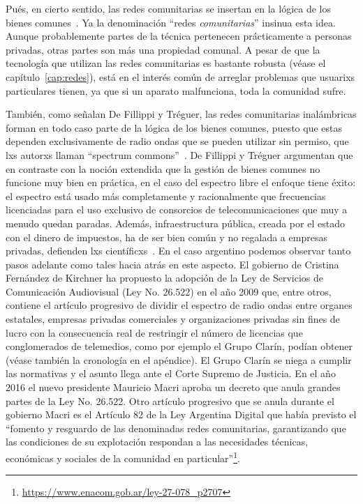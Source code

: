 Pués, en cierto sentido, las redes comunitarias se insertan en la lógica de los bienes comunes~\autocite{FiTre2015}.
Ya la denominación ``redes \textit{comunitarias}'' insinua esta idea.
Aunque probablemente partes de la técnica pertenecen prácticamente a personas privadas, otras partes son más una propiedad comunal.
A pesar de que la tecnología que utilizan las redes comunitarias es bastante robusta (véase el capítulo~\vref{cap:redes}), está en el interés común de arreglar problemas que usuarixs particulares tienen, ya que si un aparato malfunciona, toda la comunidad sufre.

También, como señalan De Fillippi y Tréguer, las redes comunitarias inalámbricas forman en todo caso parte de la lógica de los bienes comunes, puesto que estas dependen exclusivamente de radio ondas que se pueden utilizar sin permiso, que lxs autorxs llaman ``spectrum commons''~\autocite{FiTre2015}.
De Fillippi y Tréguer argumentan que en contraste con la noción extendida que la gestión de bienes comunes no funcione muy bien en práctica, en el caso del espectro libre el enfoque tiene éxito:
el espectro está usado más completamente y racionalmente que frecuencias licenciadas para el uso exclusivo de consorcios de telecomunicaciones que muy a menudo quedan paradas.
Además, infraestructura pública, creada por el estado con el dinero de impuestos, ha de ser bien común y no regalada a empresas privadas, defienden lxs científicxs~\autocite{FiTre2015}.
En el caso argentino podemos observar tanto pasos adelante como tales hacia atrás en este aspecto.
El gobierno de Cristina Fernández de Kirchner ha propuesto la adopción de la Ley de Servicios de Comunicación Audiovisual (Ley No. 26.522) en el año 2009 que, entre otros, contiene el artículo progresivo de dividir el espectro de radio ondas entre organes estatales, empresas privadas comerciales y organizaciones privadas sin fines de lucro con la consecuencia real de restringir el número de licencias que conglomerados de telemedios, como por ejemplo el Grupo Clarín, podían obtener (véase también la cronología en el apéndice).
El Grupo Clarín se niega a cumplir las normativas y el asunto llega ante el Corte Supremo de Justicia.
En el año 2016 el nuevo presidente Mauricio Macri aproba un decreto que anula grandes partes de la Ley No. 26.522.
Otro artículo progresivo que se anula durante el gobierno Macri es el Artículo 82 de la Ley Argentina Digital que había previsto el ``fomento y resguardo de las denominadas redes comunitarias, garantizando que las condiciones de su explotación respondan a las necesidades técnicas, económicas y sociales de la comunidad en particular''\footnote{\url{https://www.enacom.gob.ar/ley-27-078_p2707}}.

